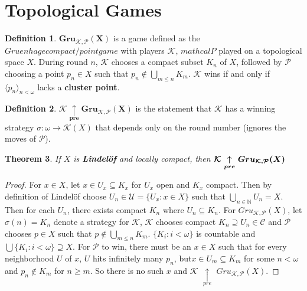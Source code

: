 \documentclass{amsart}
\theoremstyle{plain}
\newtheorem{theorem}{Theorem}
\theoremstyle{definition}
\newtheorem{definition}[theorem]{Definition}
\theoremstyle{remark}
\begin{document}
\section{Topological Games}

	\begin{definition}
		$\boldsymbol{Gru_{\mathcal{K},\mathcal{P}}(X)}$ is a game defined as the $Gruenhage compact/point game$ with players $\mathcal{K}$, $mathcal{P}$ played on a topological space $X$. During round $n$, $\mathcal{K}$ chooses a compact subset $K_n$ of $X$, followed by $\mathcal{P}$ choosing a point $p_n \in X$ such that $p_n \not\in \bigcup_{m\leq n}K_m$. $\mathcal{K}$ wins if and only if $\langle p_n \rangle_{n<\omega}$ lacks a \textbf{cluster point}. 
	\end{definition}
	
	\begin{definition}
	$\boldsymbol{\mathcal{K} \underset{pre}{\uparrow} Gru_{\mathcal{K}, \mathcal{P}}(X)}$ is the statement that $\mathcal{K}$ has a winning strategy $\sigma : \omega \rightarrow \mathcal{K}(X)$ that depends only on the round number (ignores the moves of $\mathcal{P}$).
	\end{definition}

	\begin{theorem}
		If $X$ is \textbf{Lindel\"of} and locally compact, then $\boldsymbol{\mathcal{K}$ $\underset{pre}{\uparrow}$ $Gru_{\mathcal{K}, \mathcal{P}} (X)}$
	\end{theorem}
	\begin{proof}
		For $x \in X$, let $x \in U_x \subseteq K_x$ for $U_x$ open and $K_x$ compact. Then by definition of Lindel\"of choose $U_n \in \mathcal{U} = \lbrace U_x : x \in X \rbrace$ such that $\underset{n \in \mathbb{N}}{\bigcup}U_n = X$. Then for each $U_n$, there exists compact $K_n$ where $U_n \subseteq K_n$. \newline
		For $Gru_{\mathcal{K}, \mathcal{P}} (X)$, let $\sigma(n) = K_n$ denote a strategy for $\mathcal{K}$, $\mathcal{K}$ chooses compact $K_n \supseteq U_n \in \mathcal{C}$ and $\mathcal{P}$ chooses $p \in X$ such that $p \not\in \underset{m \leq n}{\bigcup}K_m$. $\lbrace K_i : i < \omega \rbrace$ is countable and $\bigcup \lbrace K_i : i < \omega \rbrace \supseteq X$. For $\mathcal{P}$ to win, there must be an $x \in X$ such that for every neighborhood $U$ of $x$, $U$ hits infinitely many $p_n$, but$x \in U_m \subseteq K_m$ for some $n < \omega$ and $p_n \not\in K_m$ for $n \geq m$. So there is no such $x$ and $\mathcal{K}$ $\underset{pre}{\uparrow}$ $Gru_{\mathcal{K}, \mathcal{P}} (X)$.
	\end{proof}
\end{document}

